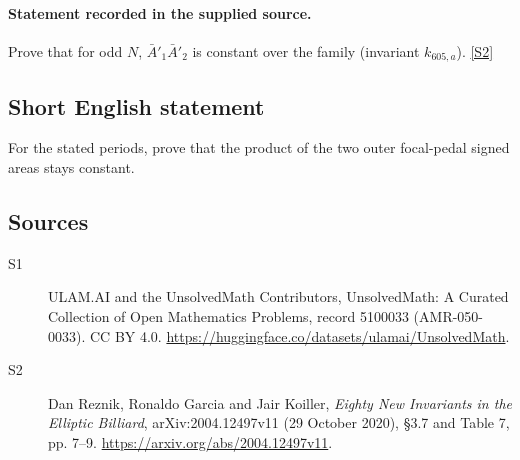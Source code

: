 \documentclass[11pt]{article}
\newcommand{\sref}[2]{\hyperlink{source:#1:#2}{[S#2]}}
\begin{document}
\paragraph{Statement recorded in the supplied source.}
Prove that for odd $N$, $\bar A'_1\bar A'_2$ is constant over the family (invariant $k_{605,a}$). \sref{5100033}{2}
\subsection{Short English statement}
For the stated periods, prove that the product of the two outer focal-pedal signed areas stays constant.
\subsection{Sources}
\begin{description}
\item[\hypertarget{source:5100033:1}{S1}] ULAM.AI and the UnsolvedMath Contributors, UnsolvedMath: A Curated Collection of Open Mathematics Problems, record 5100033 (AMR-050-0033). CC BY 4.0. \url{https://huggingface.co/datasets/ulamai/UnsolvedMath}.
\item[\hypertarget{source:5100033:2}{S2}] Dan Reznik, Ronaldo Garcia and Jair Koiller, \emph{Eighty New Invariants in the Elliptic Billiard}, arXiv:2004.12497v11 (29 October 2020), \S3.7 and Table 7, pp. 7--9. \url{https://arxiv.org/abs/2004.12497v11}.
\end{description}
\label{end:5100033}
\end{document}
